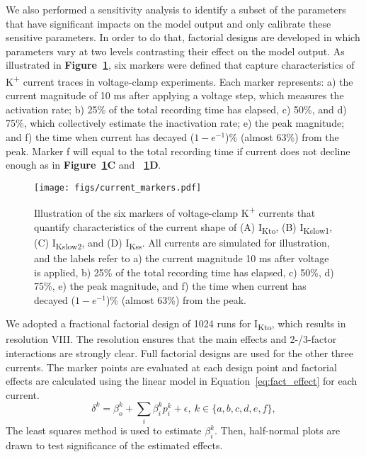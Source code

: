 \documentclass[11pt]{article}
\begin{document}
We also performed a sensitivity analysis to identify a subset of the parameters that have significant impacts on the model output and only calibrate these sensitive parameters. In order to do that, factorial designs are developed in which parameters vary at two levels contrasting their effect on the model output. As illustrated in \textbf{Figure~\ref{fig:current_markers}}, six markers were defined that capture characteristics of K\textsuperscript{+} current traces in voltage-clamp experiments. Each marker represents: a) the current magnitude of 10 ms after applying a voltage step, which measures the activation rate; b) 25\% of the total recording time has elapsed, c) 50\%, and d) 75\%, which collectively estimate the inactivation rate; e) the peak magnitude; and f) the time when current has decayed ($1-e^{-1}$)\% (almost 63\%) from the peak. Marker f will equal to the total recording time if current does not decline enough as in \textbf{Figure~\ref{fig:current_markers}C} and \textbf{~\ref{fig:current_markers}D}. 
\begin{figure}[!ht]
    \centering
    \texttt{[image: figs/current\_markers.pdf]}
    \caption{Illustration of the six markers of voltage-clamp K\textsuperscript{+} currents that quantify characteristics of the current shape of (A) I\textsubscript{Kto}, (B) I\textsubscript{Kslow1}, (C) I\textsubscript{Kslow2}, and (D) I\textsubscript{Kss}. All currents are simulated for illustration, and the labels refer to a) the current magnitude 10 ms after voltage is applied, b) 25\% of the total recording time has elapsed, c) 50\%, d) 75\%, e) the peak magnitude, and f) the time when current has decayed ($1-e^{-1}$)\% (almost 63\%) from the peak.}
    \label{fig:current_markers}
\end{figure}

We adopted a fractional factorial design of 1024 runs for I\textsubscript{Kto}, which results in resolution VIII. The resolution ensures that the main effects and 2-/3-factor interactions are strongly clear. Full factorial designs are used for the other three currents. The marker points are evaluated at each design point and factorial effects are calculated using the linear model in Equation~\ref{eq:fact_effect} for each current.
\begin{equation}
    \delta^{k} = \beta_{o}^{k} + \sum\limits_{i}\beta_{i}^{k}p_{i}^{k} + \epsilon, \ k \in \{a,b,c,d,e,f\},
    \label{eq:fact_effect}
\end{equation}
The least squares method is used to estimate $\beta_{i}^{k}$. Then, half-normal plots are drawn to test significance of the estimated effects. 
\end{document}
